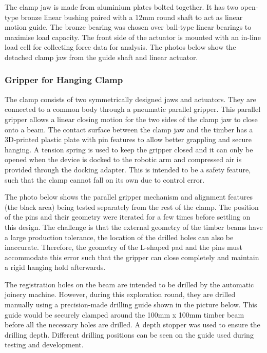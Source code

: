 The clamp jaw is made from aluminium plates bolted together. It has two open-type bronze linear bushing paired with a 12mm round shaft to act as linear motion guide. The bronze bearing was chosen over ball-type linear bearings to maximise load capacity. The front side of the actuator is mounted with an in-line load cell for collecting force data for analysis. The photos below show the detached clamp jaw from the guide shaft and linear actuator. 

\subsubsection{Gripper for Hanging Clamp}
\label{subsubsection:exploration_1_gripper_for_hanging_clamp}

The clamp consists of two symmetrically designed jaws and actuators. They are connected to a common body through a pneumatic parallel gripper. This parallel gripper allows a linear closing motion for the two sides of the clamp jaw to close onto a beam.
The contact surface between the clamp jaw and the timber has a 3D-printed plastic plate with pin features to allow better grappling and secure hanging. A tension spring is used to keep the gripper closed and it can only be opened when the device is docked to the robotic arm and compressed air is provided through the docking adapter. This is intended to be a safety feature, such that the clamp cannot fall on its own due to control error.

The photo below shows the parallel gripper mechanism and alignment features (the black area) being tested separately from the rest of the clamp. The position of the pins and their geometry were iterated for a few times before settling on this design. The challenge is that the external geometry of the timber beams have a large production tolerance, the location of the drilled holes can also be inaccurate. Therefore, the geometry of the L-shaped pad and the pins must accommodate this error such that the gripper can close completely and maintain a rigid hanging hold afterwards.

The registration holes on the beam are intended to be drilled by the automatic joinery machine. However, during this exploration round, they are drilled manually using a precision-made drilling guide shown in the picture below. This guide would be securely  clamped around the 100mm x 100mm timber beam before all the necessary holes are drilled. A depth stopper was used to ensure the drilling depth. Different drilling positions can be seen on the guide used during testing and development.


